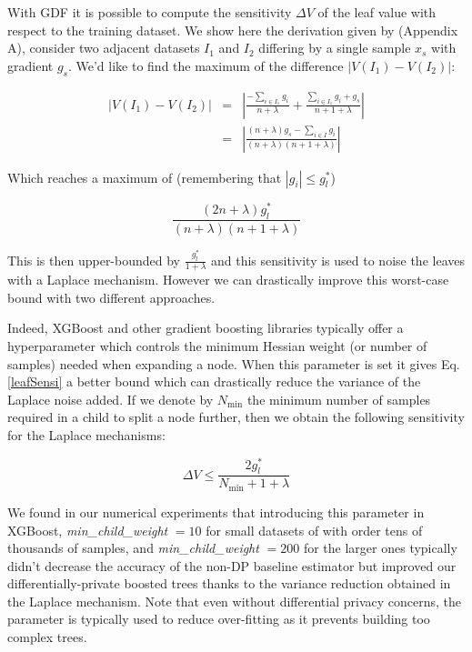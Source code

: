 \documentclass{article}
\theoremstyle{definition}
\begin{document}
With GDF it is possible to compute the sensitivity $\Delta V$ of the leaf value with respect to the training dataset. We show here the derivation given by \cite{li2020privacy} (Appendix A), consider two adjacent datasets $I_1$ and $I_2$ differing by a single sample $x_s$ with gradient $g_s$. We'd like to find the maximum of the difference $\vert V(I_1) - V(I_2) \vert$:

\begin{eqnarray*}
\vert V(I_1) - V(I_2) \vert &=& \left\vert \frac{-\sum_{i \in I_1} g_i }{n+\lambda} + \frac{\sum_{i \in I_1} g_i + g_s}{n+1+\lambda} \right\vert \\
 &=& \left\vert \frac{ (n+\lambda)g_s - \sum_{i \in I} g_i}{(n+\lambda)(n+1+\lambda)} \right\vert  
\end{eqnarray*} 

Which reaches a maximum of (remembering that $|g_i| \leq g_l^*$)  

\begin{equation}
\frac{(2n+\lambda)g_l^*}{(n+\lambda)(n+1+\lambda)} 
\label{leafSensi}
\end{equation} 

This is then upper-bounded by $\frac{g_l^*}{1+\lambda}$ and this sensitivity is used to noise the leaves with a Laplace mechanism. However we
can drastically improve this worst-case bound with two different approaches. 

Indeed, XGBoost and other gradient boosting libraries typically offer a hyperparameter which controls the minimum Hessian weight (or number of samples) needed when expanding a node. When this parameter is set it gives Eq. \ref{leafSensi} a better bound which can drastically reduce
the variance of the Laplace noise added. If we denote by $N_{\text{min}}$ the minimum number of samples required in a child to split a node further, then we obtain the following sensitivity for the Laplace mechanisms: 

\begin{equation}
\Delta V \leq \frac{2 g_l^*}{N_{\text{min}} + 1 + \lambda} 
\end{equation} 

We found in our numerical experiments that introducing this parameter in XGBoost, \textit{min\_child\_weight} $= 10$ for small
datasets of with order tens of thousands of samples, and \textit{min\_child\_weight} $= 200$ for the larger ones typically didn't decrease the accuracy of the non-DP baseline estimator but improved our differentially-private boosted trees thanks to the variance reduction obtained in the Laplace mechanism. Note that even without differential privacy concerns, the parameter is typically
used to reduce over-fitting as it prevents building too complex trees.  
\end{document}
